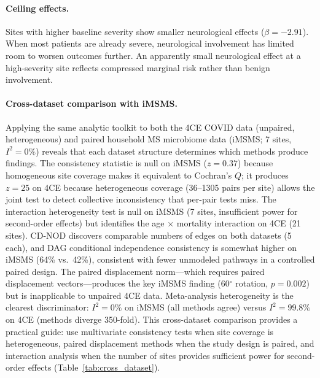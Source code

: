 \documentclass{article}
\begin{document}
\paragraph{Ceiling effects.}
Sites with higher baseline severity show smaller neurological effects ($\beta = -2.91$).
When most patients are already severe, neurological involvement has limited room to worsen outcomes further.
An apparently small neurological effect at a high-severity site reflects compressed marginal risk rather than benign involvement.

\paragraph{Cross-dataset comparison with iMSMS.}
Applying the same analytic toolkit to both the 4CE COVID data (unpaired, heterogeneous) and paired household MS microbiome data (iMSMS; 7 sites, $I^2 = 0\%$) reveals that each dataset structure determines which methods produce findings.
The consistency statistic is null on iMSMS ($z = 0.37$) because homogeneous site coverage makes it equivalent to Cochran's $Q$; it produces $z = 25$ on 4CE because heterogeneous coverage (36--1305 pairs per site) allows the joint test to detect collective inconsistency that per-pair tests miss.
The interaction heterogeneity test is null on iMSMS (7 sites, insufficient power for second-order effects) but identifies the age $\times$ mortality interaction on 4CE (21 sites).
CD-NOD discovers comparable numbers of edges on both datasets (5 each), and DAG conditional independence consistency is somewhat higher on iMSMS (64\% vs.\ 42\%), consistent with fewer unmodeled pathways in a controlled paired design.
The paired displacement norm---which requires paired displacement vectors---produces the key iMSMS finding (60$^{\circ}$ rotation, $p = 0.002$) but is inapplicable to unpaired 4CE data.
Meta-analysis heterogeneity is the clearest discriminator: $I^2 = 0\%$ on iMSMS (all methods agree) versus $I^2 = 99.8\%$ on 4CE (methods diverge 350-fold).
This cross-dataset comparison provides a practical guide: use multivariate consistency tests when site coverage is heterogeneous, paired displacement methods when the study design is paired, and interaction analysis when the number of sites provides sufficient power for second-order effects (Table~\ref{tab:cross_dataset}).
\end{document}
